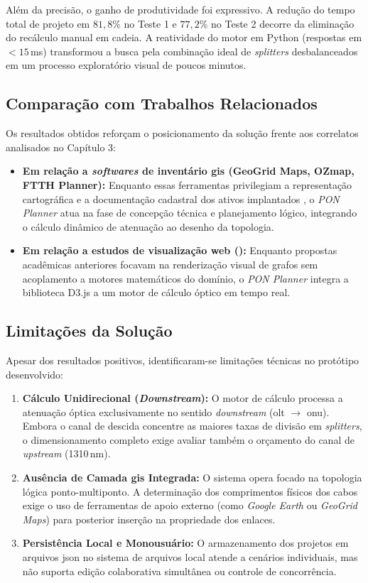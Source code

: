 Além da precisão, o ganho de produtividade foi expressivo. A redução do tempo total de projeto em $81{,}8\%$ no Teste 1 e $77{,}2\%$ no Teste 2 decorre da eliminação do recálculo manual em cadeia. A reatividade do motor em Python (respostas em $<15$\,ms) transformou a busca pela combinação ideal de \textit{splitters} desbalanceados em um processo exploratório visual de poucos minutos.

\subsection{Comparação com Trabalhos Relacionados}

Os resultados obtidos reforçam o posicionamento da solução frente aos correlatos analisados no Capítulo 3:

\begin{itemize}
    \item \textbf{Em relação a \textit{softwares} de inventário \gls{gis} (GeoGrid Maps, OZmap, FTTH Planner):} Enquanto essas ferramentas privilegiam a representação cartográfica e a documentação cadastral dos ativos implantados \cite{geogridmaps2026,ozmap2026,ftthplanner2026}, o \textit{PON Planner} atua na fase de concepção técnica e planejamento lógico, integrando o cálculo dinâmico de atenuação ao desenho da topologia.
    \item \textbf{Em relação a estudos de visualização web ():} Enquanto propostas acadêmicas anteriores focavam na renderização visual de grafos sem acoplamento a motores matemáticos do domínio, o \textit{PON Planner} integra a biblioteca D3.js a um motor de cálculo óptico em tempo real.
\end{itemize}

\subsection{Limitações da Solução}

Apesar dos resultados positivos, identificaram-se limitações técnicas no protótipo desenvolvido:
\begin{enumerate}
    \item \textbf{Cálculo Unidirecional (\textit{Downstream}):} O motor de cálculo processa a atenuação óptica exclusivamente no sentido \textit{downstream} (\gls{olt} $\rightarrow$ \gls{onu}). Embora o canal de descida concentre as maiores taxas de divisão em \textit{splitters}, o dimensionamento completo exige avaliar também o orçamento do canal de \textit{upstream} (1310\,nm).
    \item \textbf{Ausência de Camada \gls{gis} Integrada:} O sistema opera focado na topologia lógica ponto-multiponto. A determinação dos comprimentos físicos dos cabos exige o uso de ferramentas de apoio externo (como \textit{Google Earth} ou \textit{GeoGrid Maps}) para posterior inserção na propriedade dos enlaces.
    \item \textbf{Persistência Local e Monousuário:} O armazenamento dos projetos em arquivos \gls{json} no sistema de arquivos local atende a cenários individuais, mas não suporta edição colaborativa simultânea ou controle de concorrência.
\end{enumerate}

